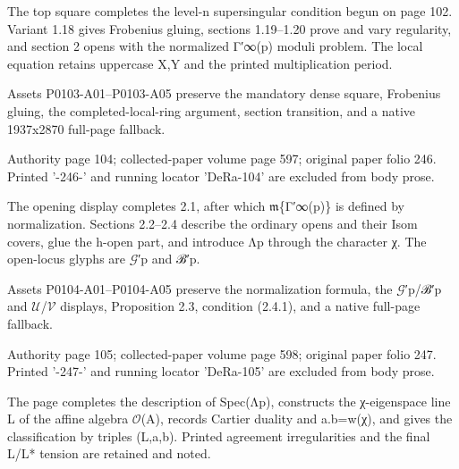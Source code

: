 \documentclass[11pt,a4paper]{article}
\begin{document}
The top square completes the level-n supersingular condition begun on page 102. Variant 1.18 gives Frobenius gluing, sections 1.19--1.20 prove and vary regularity, and section 2 opens with the normalized Γ′\textunderscore{}∞(p) moduli problem. The local equation retains uppercase X,Y and the printed multiplication period.

Assets P0103-A01--P0103-A05 preserve the mandatory dense square, Frobenius gluing, the completed-local-ring argument, section transition, and a native 1937x2870 full-page fallback.


\par\medskip
\hypertarget{D018-P0104}{}
\par\smallskip
Authority page 104; collected-paper volume page 597; original paper folio 246. Printed '-246-' and running locator 'DeRa-104' are excluded from body prose.

The opening display completes 2.1, after which \ensuremath{\mathfrak{m}}\textunderscore{}\{Γ′\textunderscore{}∞(p)\} is defined by normalization. Sections 2.2--2.4 describe the ordinary opens and their Isom covers, glue the h-open part, and introduce Λ\textunderscore{}p through the character χ. The open-locus glyphs are \ensuremath{\mathcal{G}}′\textunderscore{}p and ℬ′\textunderscore{}p.

Assets P0104-A01--P0104-A05 preserve the normalization formula, the \ensuremath{\mathcal{G}}′\textunderscore{}p/ℬ′\textunderscore{}p and \ensuremath{\mathcal{U}}/\ensuremath{\mathcal{V}} displays, Proposition 2.3, condition (2.4.1), and a native full-page fallback.


\par\medskip
\hypertarget{D018-P0105}{}
\par\smallskip
Authority page 105; collected-paper volume page 598; original paper folio 247. Printed '-247-' and running locator 'DeRa-105' are excluded from body prose.

The page completes the description of Spec(Λ\textunderscore{}p), constructs the χ-eigenspace line L of the affine algebra \ensuremath{\mathcal{O}}(A), records Cartier duality and a.b=w(χ), and gives the classification by triples (L,a,b). Printed agreement irregularities and the final L/L* tension are retained and noted.
\end{document}
